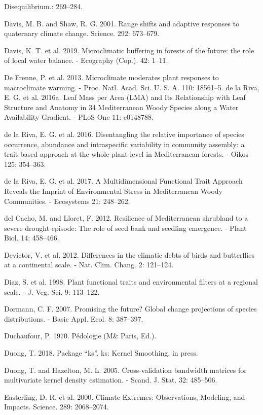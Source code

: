 \documentclass[11pt,twoside]{reedthesis}
\begin{document}
Disequilibrium.: 269--284.\par
Davis, M. B. and Shaw, R. G. 2001. Range shifts and adaptive responses
to quaternary climate change. Science. 292: 673--679.\par
Davis, K. T. et al. 2019. Microclimatic buffering in forests of the
future: the role of local water balance. - Ecography (Cop.). 42:
1--11.\par
De Frenne, P. et al. 2013. Microclimate moderates plant responses to
macroclimate warming. - Proc. Natl. Acad. Sci. U. S. A. 110: 18561--5.
de la Riva, E. G. et al. 2016a. Leaf Mass per Area (LMA) and Its
Relationship with Leaf Structure and Anatomy in 34 Mediterranean Woody
Species along a Water Availability Gradient. - PLoS One 11:
e0148788.\par
de la Riva, E. G. et al. 2016. Disentangling the relative importance of
species occurrence, abundance and intraspecific variability in community
assembly: a trait-based approach at the whole-plant level in
Mediterranean forests. - Oikos 125: 354--363.\par
de la Riva, E. G. et al. 2017. A Multidimensional Functional Trait
Approach Reveals the Imprint of Environmental Stress in Mediterranean
Woody Communities. - Ecosystems 21: 248--262.\par
del Cacho, M. and Lloret, F. 2012. Resilience of Mediterranean shrubland
to a severe drought episode: The role of seed bank and seedling
emergence. - Plant Biol. 14: 458--466.\par
Devictor, V. et al. 2012. Differences in the climatic debts of birds and
butterflies at a continental scale. - Nat. Clim. Chang. 2: 121--124.\par
Diaz, S. et al. 1998. Plant functional traits and environmental filters
at a regional scale. - J. Veg. Sci. 9: 113--122.\par
Dormann, C. F. 2007. Promising the future? Global change projections of
species distributions. - Basic Appl. Ecol. 8: 387--397.\par
Duchaufour, P. 1970. Pédologie (M\& Paris, Ed.).\par
Duong, T. 2018. Package ``ks''. ks: Kernel Smoothing. in press.\par
Duong, T. and Hazelton, M. L. 2005. Cross-validation bandwidth matrices
for multivariate kernel density estimation. - Scand. J. Stat. 32:
485--506.\par
Easterling, D. R. et al. 2000. Climate Extremes: Observations, Modeling,
and Impacts. Science. 289: 2068--2074.\par
\end{document}
